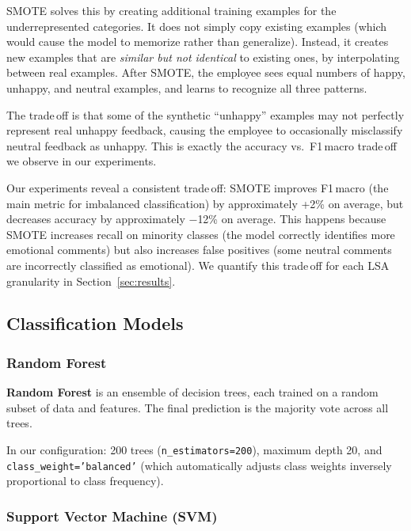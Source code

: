 \documentclass[12pt,a4paper,twoside]{article}
\theoremstyle{definition}
\begin{document}
SMOTE solves this by creating additional training examples for the underrepresented categories. It does not simply copy existing examples (which would cause the model to memorize rather than generalize). Instead, it creates new examples that are \textit{similar but not identical} to existing ones, by interpolating between real examples. After SMOTE, the employee sees equal numbers of happy, unhappy, and neutral examples, and learns to recognize all three patterns.
 
The trade\,off is that some of the synthetic ``unhappy'' examples may not perfectly represent real unhappy feedback, causing the employee to occasionally misclassify neutral feedback as unhappy. This is exactly the accuracy vs.\ F1\,macro trade\,off we observe in our experiments.

\begin{notebox}
Our experiments reveal a consistent trade\,off: SMOTE improves F1\,macro (the main metric for imbalanced classification) by approximately +2\% on average, but decreases accuracy by approximately $-$12\% on average. This happens because SMOTE increases recall on minority classes (the model correctly identifies more emotional comments) but also increases false positives (some neutral comments are incorrectly classified as emotional). We quantify this trade\,off for each LSA granularity in Section~\ref{sec:results}.
\end{notebox}

\subsection{Classification Models}

\subsubsection{Random Forest}

\textbf{Random Forest} \citep{breiman2001random} is an ensemble of decision trees, each trained on a random subset of data and features. The final prediction is the majority vote across all trees.

In our configuration: 200 trees (\texttt{n\_estimators=200}), maximum depth 20, and \texttt{class\_weight='balanced'} (which automatically adjusts class weights inversely proportional to class frequency).

\subsubsection{Support Vector Machine (SVM)}
\end{document}
